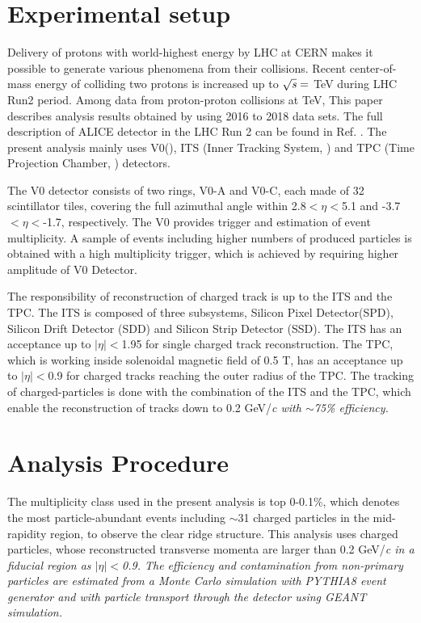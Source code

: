 \section{Experimental setup}

Delivery of protons with world-highest energy by LHC at CERN makes it possible to generate various phenomena from their collisions. Recent center-of-mass energy of colliding two protons is increased up to $\sqrt{\it{s}} =$ \unit[13]{TeV} during LHC Run2 period. Among data from proton-proton collisions at \unit[13]{TeV}, This paper describes analysis results obtained by using 2016 to 2018 data sets. The full description of ALICE detector in the LHC Run 2 can be found in Ref. \cite{ALICEdet}. The present analysis mainly uses V0(\cite{VZEROpaper}), ITS (Inner Tracking System, \cite{ITSpaper}) and TPC (Time Projection Chamber, \cite{TPCpaper}) detectors.

The V0 detector consists of two rings, V0-A and V0-C, each made of 32 scintillator tiles, covering the full azimuthal angle within 2.8$<\eta<$5.1 and -3.7$<\eta<$-1.7, respectively. The V0 provides trigger and estimation of event multiplicity. A sample of events including higher numbers of produced particles is obtained with a high multiplicity trigger, which is achieved by requiring higher amplitude of V0 Detector. 

The responsibility of reconstruction of charged track is up to the ITS and the TPC. The ITS is composed of three subsystems, Silicon Pixel Detector(SPD), Silicon Drift Detector (SDD) and Silicon Strip Detector (SSD). The ITS has an acceptance up to $|\eta|<$1.95 for single charged track reconstruction. The TPC, which is working inside solenoidal magnetic field of 0.5 T, has an acceptance up to $|\eta|<$0.9 for charged tracks reaching the outer radius of the TPC. The tracking of charged-particles is done with the combination of the ITS and the TPC, which enable the reconstruction of tracks down to 0.2 GeV/\it{c}\rm{} with $\sim$75\% efficiency.

\section{Analysis Procedure}

The multiplicity class used in the present analysis is top 0-0.1\%, which denotes the most particle-abundant events including  $\sim$31 charged particles in the mid-rapidity region, to observe the clear ridge structure. This analysis uses charged particles, whose reconstructed transverse momenta are larger than 0.2 GeV/\it{c}\rm{} in a fiducial region as $|\eta|<$0.9. The efficiency and contamination from non-primary particles are estimated from a Monte Carlo simulation with PYTHIA8 event generator and with particle transport through the detector using GEANT simulation.

